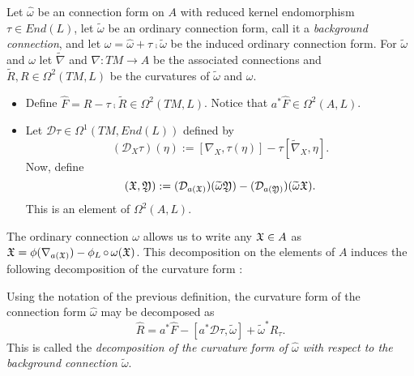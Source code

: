 \begin{definition}\label{definitionIngredientsCurvatureDecompositionConnection}
Let $\hat \omega$ be an connection form on $A$ with reduced kernel endomorphism $\tau \in End(L)$, let $\tilde \omega$ be an ordinary connection form, call it a \emph{background connection}, and let $\omega = \hat \omega + \tau \comp \tilde \omega$ be the induced ordinary connection form. For $\tilde \omega$ and $\omega$ let $\tilde \nabla$ and $\nabla: TM \to A$ be the associated connections and $\tilde R, R \in \Omega^2(TM, L)$ be the curvatures of $\tilde \omega$ and $\omega$.

    \begin{itemize}
        
    \item Define $\hat F = R - \tau \comp \tilde R \in \Omega^2(TM, L)$. Notice that $a^* \hat F \in \Omega^2(A, L)$.
    
    \item Let $\mathcal D \tau \in \Omega^1(TM, End(L))$ defined by
        \begin{equation}
            (\mathcal D_X \tau)(\eta) := [\nabla_X, \tau(\eta)] - \tau[\tilde \nabla_X, \eta].
        \end{equation}
        Now, define 
        \begin{equation}
            [a^* \mathcal D \tau, \tilde \omega] (\oid X, \oid Y) := (\mathcal D_{a(\oid X)})(\tilde \omega \oid Y) - (\mathcal D_{a(\oid Y)})(\tilde \omega \oid X).
        \end{equation} This is an element of $\Omega^2(A, L)$.
        
    \end{itemize}
\end{definition}

The ordinary connection $\omega$ allows us to write any $\mathfrak{X} \in A$ as $\oid X = \phi(\nabla_{a(\oid X)}) - \phi_L \comp \omega(\oid X)$. This decomposition on the elements of $A$ induces the following decomposition of the curvature form \cite{Fournel2013}:
\begin{theorem}\label{theoremGlobalDecompositionOfCurvatureFormWithRespectToBackgroundConnection}
Using the notation of the previous definition, the curvature form of the connection form $\hat \omega$ may be decomposed as
\begin{equation}
    \hat R = a^* \hat F - [a^* \mathcal D \tau, \tilde \omega] + \tilde \omega ^* R_\tau.
\end{equation}
This is called the \emph{decomposition of the curvature form of $\hat \omega$ with respect to the background connection $\tilde \omega$}.
\end{theorem}

